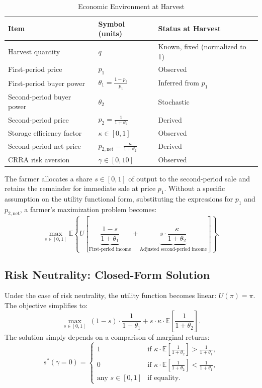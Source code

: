 \begin{table}[H]
\centering
\caption{Economic Environment at Harvest}
\label{tab:baseline model parameter table}
\begin{tabular}{lll}
\toprule
\textbf{Item} & \textbf{Symbol (units)} & \textbf{Status at Harvest} \\
\midrule
Harvest quantity & $q$ & Known, fixed (normalized to 1) \\
First-period price & $p_1$ & Observed \\
First-period buyer power & $\theta_1 = \frac{1 - p_1}{p_1}$ & Inferred from $p_1$ \\
Second-period buyer power & $\theta_2$ & Stochastic \\
Second-period price & $p_2 = \frac{1}{1 + \theta_2}$ & Derived \\
Storage efficiency factor & $\kappa \in [0,1]$ & Observed \\
Second-period net price & $p_{2,\text{net}} = \frac{\kappa}{1 + \theta_2}$ & Derived \\
CRRA risk aversion & $\gamma \in [0,10]$ & Observed \\
\bottomrule
\end{tabular}
\end{table}

\noindent The farmer allocates a share $s \in [0,1]$ of output to the second-period sale and retains the remainder for immediate sale at price $p_1$. Without a specific assumption on the utility functional form, substituting the expressions for $p_1$ and $p_{2,\text{net}}$, a farmer's maximization problem becomes:
\begin{equation}
\label{eq:final objective}
\max_{s \in [0,1]} \mathbb{E} \left\{U\left[\underbrace{\frac{1-s}{1+\theta_1}}_{\text{First-period income}} + \underbrace{s \cdot \frac{\kappa}{1+\theta_2}}_{\text{Adjusted second-period income}} \right]\right\}.
\end{equation}


\subsection{Risk Neutrality: Closed-Form Solution}
\noindent Under the case of risk neutrality, the utility function becomes linear: $U(\pi) = \pi$. The objective simplifies to:
\begin{equation}
\max_{s \in [0,1]} \; 
(1 - s) \cdot \frac{1}{1 + \theta_1} 
+ 
s \cdot \kappa \cdot \mathbb{E} \left[ \frac{1}{1 + \theta_2} \right].
\end{equation}
The solution simply depends on a comparison of marginal returns:
\begin{equation}
s^*( \gamma = 0) =
\begin{cases}
1 & \text{if } \kappa \cdot \mathbb{E} \left[ \frac{1}{1 + \theta_2} \right] > \frac{1}{1 + \theta_1}, \\
0 & \text{if } \kappa \cdot \mathbb{E} \left[ \frac{1}{1 + \theta_2} \right] < \frac{1}{1 + \theta_1}, \\
\text{any } s \in [0,1] & \text{if equality}.
\end{cases}
\label{Eq: risk-neutrality solution}
\end{equation}


